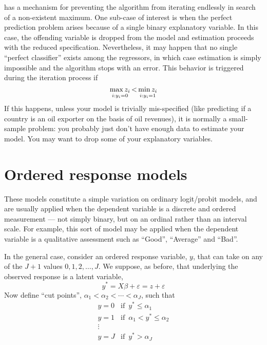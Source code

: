  has a mechanism for preventing the algorithm from
iterating endlessly in search of a non-existent maximum. One sub-case
of interest is when the perfect prediction problem arises because of
a single binary explanatory variable. In this case, the offending
variable is dropped from the model and estimation proceeds with the
reduced specification. Nevertheless, it may happen that no single
``perfect classifier'' exists among the regressors, in which case
estimation is simply impossible and the algorithm stops with an
error. This behavior is triggered during the iteration process if
\[
  \stackunder{i: y_i = 0}{\max z_i} \, < \,
  \stackunder{i: y_i = 1}{\min z_i}  
\]
If this happens, unless your model is trivially mis-specified (like
predicting if a country is an oil exporter on the basis of oil
revenues), it is normally a small-sample problem: you probably just
don't have enough data to estimate your model. You may want to drop
some of your explanatory variables.

\section{Ordered response models}
\label{sec:ordered}

These models constitute a simple variation on ordinary logit/probit
models, and are usually applied when the dependent variable is a
discrete and ordered measurement --- not simply binary, but on an
ordinal rather than an interval scale.  For example, this sort of
model may be applied when the dependent variable is a qualitative
assessment such as ``Good'', ``Average'' and ``Bad''.  

In the general case, consider an ordered response variable, $y$, that
can take on any of the $J+1$ values ${0,1,2,\dots,J}$.  We suppose, as
before, that underlying the observed response is a latent variable,
\[
  y^* = X\beta + \varepsilon = z + \varepsilon
\]
Now define ``cut points'', $\alpha_1 < \alpha_2 < \cdots < \alpha_J$,
such that
%
\begin{equation*}
  \begin{array}{ll}
    y = 0 & \textrm{if } \, y^* \leq \alpha_1 \\
    y = 1 & \textrm{if } \, \alpha_1 < y^* \leq \alpha_2 \\
    \vdots \\
    y = J & \textrm{if } \, y^* > \alpha_J \\
  \end{array}
\end{equation*}

